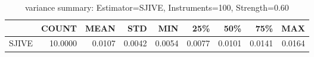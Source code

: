 \begin{table}[ht]
\centering
\caption{variance summary: Estimator=SJIVE, Instruments=100, Strength=0.60}
\begin{tabular}{lrrrrrrrr}
\toprule
 & COUNT & MEAN & STD & MIN & 25\% & 50\% & 75\% & MAX \\
\midrule
SJIVE & 10.0000 & 0.0107 & 0.0042 & 0.0054 & 0.0077 & 0.0101 & 0.0141 & 0.0164 \\
\bottomrule
\end{tabular}
\end{table}
